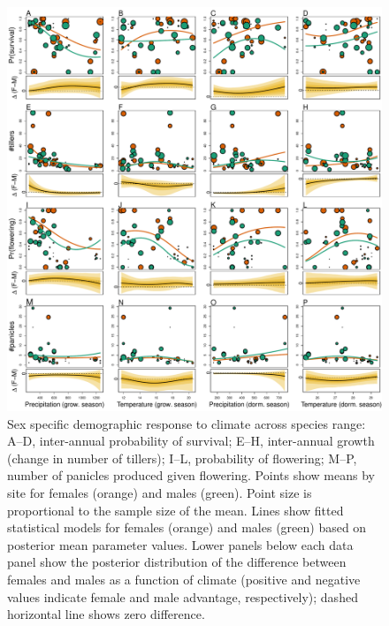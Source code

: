 \documentclass[12pt]{article}
\begin{document}
\begin{figure}[h!]
  \begin{center}
    \includegraphics[width=0.95\linewidth]{Figures/vital_rates.pdf}
  \caption{Sex specific demographic response to climate across species range: A--D, inter-annual probability of survival; E--H, inter-annual growth (change in number of tillers); I--L, probability of flowering; M--P, number of panicles produced given flowering. 
  Points show means by site for females (orange) and males (green). 
  Point size is proportional to the sample size of the mean.
  Lines show fitted statistical models for females (orange) and males (green) based on posterior mean parameter values.
  Lower panels below each data panel show the posterior distribution of the difference between females and males as a function of climate (positive and negative values indicate female and male advantage, respectively); dashed horizontal line shows zero difference.}
  \label{fig:vital_rates}
  \end{center}
\end{figure}
\end{document}
